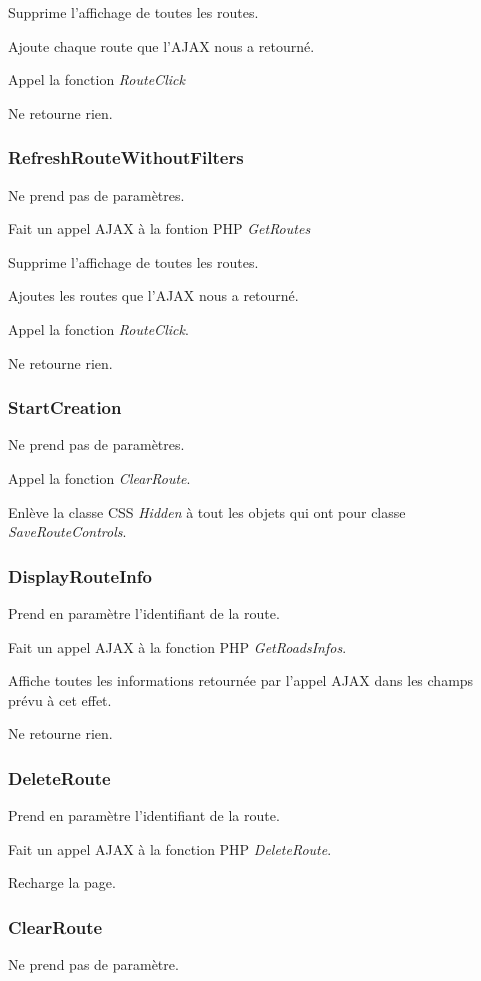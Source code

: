 \documentclass[a4paper]{article}
\begin{document}
Supprime l'affichage de toutes les routes. 

Ajoute chaque route que l'AJAX nous a retourné.

Appel la fonction \emph{RouteClick}

Ne retourne rien.

\subsubsection{RefreshRouteWithoutFilters}
Ne prend pas de paramètres.

Fait un appel AJAX à la fontion PHP \emph{GetRoutes}

Supprime l'affichage de toutes les routes.

Ajoutes les routes que l'AJAX nous a retourné.

Appel la fonction \emph{RouteClick}.

Ne retourne rien.

\subsubsection{StartCreation}
Ne prend pas de paramètres.

Appel la fonction \emph{ClearRoute}.

Enlève la classe CSS \emph{Hidden} à tout les objets qui ont pour classe \emph{SaveRouteControls}.


\subsubsection{DisplayRouteInfo}
Prend en paramètre l'identifiant de la route.

Fait un appel AJAX à la fonction PHP \emph{GetRoadsInfos}.

Affiche toutes les informations retournée par l'appel AJAX dans les champs prévu à cet effet.

Ne retourne rien.

\subsubsection{DeleteRoute}
Prend en paramètre l'identifiant de la route.

Fait un appel AJAX à la fonction PHP \emph{DeleteRoute}.

Recharge la page.


\subsubsection{ClearRoute}
Ne prend pas de paramètre.
\end{document}
